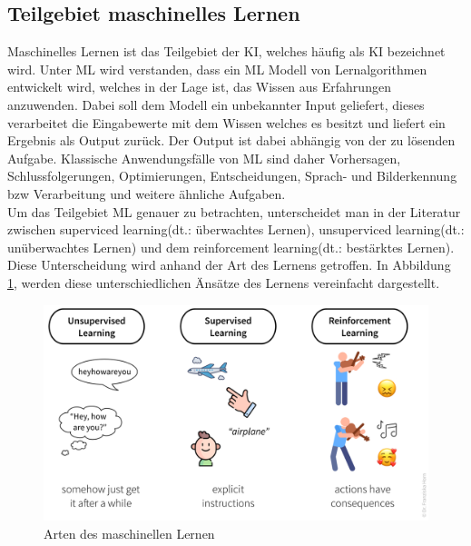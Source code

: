 \begin{onehalfspace}
    \subsection{Teilgebiet maschinelles Lernen}
    \label{subsubsec:teilgebietML}
        Maschinelles Lernen ist das Teilgebiet der \ac{KI}, welches häufig als \ac*{KI} bezeichnet wird. Unter \ac{ML} wird verstanden, dass ein \ac*{ML} Modell von Lernalgorithmen entwickelt wird, welches in der Lage ist, das Wissen aus Erfahrungen anzuwenden. Dabei soll dem Modell ein unbekannter Input geliefert, dieses verarbeitet die Eingabewerte mit dem Wissen welches es besitzt und liefert ein Ergebnis als Output zurück. Der Output ist dabei abhängig von der zu lösenden Aufgabe. Klassische Anwendungsfälle von \ac*{ML} sind daher Vorhersagen, Schlussfolgerungen, Optimierungen, Entscheidungen, Sprach- und Bilderkennung \ac*{bzw} Verarbeitung und weitere ähnliche Aufgaben.\cite{HEGKI2019}
        \\
        Um das Teilgebiet \ac{ML} genauer zu betrachten, unterscheidet man in der Literatur zwischen \glqq{}superviced learning\grqq{}(\ac*{dt}.: überwachtes Lernen), \glqq{}unsuperviced learning\grqq{}(\ac*{dt}.: unüberwachtes Lernen) und dem \glqq{}reinforcement learning\grqq{}(\ac*{dt}.: bestärktes Lernen).\cite{Datenkommission2019} Diese Unterscheidung wird anhand der Art des Lernens getroffen.\cite{Horn2022} In Abbildung \ref*{fig:ml_algorithms}, werden diese unterschiedlichen Änsätze des Lernens vereinfacht dargestellt. 
        \begin{figure}[h]
            \centering
            \includegraphics[width = 14cm]{Bilder/ml_algorithms.png}
            \caption{Arten des maschinellen Lernen\cite{Horn2022}}
            \label{fig:ml_algorithms}
        \end{figure}
        \\

\end{onehalfspace}
